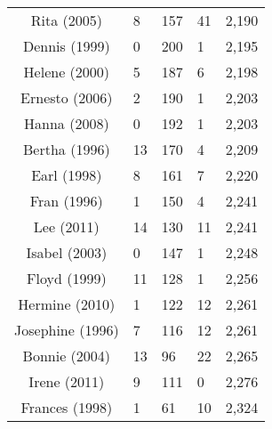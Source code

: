\begin{table}[ht]
\begin{tabular}{cP{3cm}P{3cm}P{3cm}P{3cm}}
  Rita (2005) & 8 & 157 & 41 & 2,190 \\ 
  Dennis (1999) & 0 & 200 & 1 & 2,195 \\ 
  Helene (2000) & 5 & 187 & 6 & 2,198 \\ 
  Ernesto (2006) & 2 & 190 & 1 & 2,203 \\ 
  Hanna (2008) & 0 & 192 & 1 & 2,203 \\ 
  Bertha (1996) & 13 & 170 & 4 & 2,209 \\ 
  Earl (1998) & 8 & 161 & 7 & 2,220 \\ 
  Fran (1996) & 1 & 150 & 4 & 2,241 \\ 
  Lee (2011) & 14 & 130 & 11 & 2,241 \\ 
  Isabel (2003) & 0 & 147 & 1 & 2,248 \\ 
  Floyd (1999) & 11 & 128 & 1 & 2,256 \\ 
  Hermine (2010) & 1 & 122 & 12 & 2,261 \\ 
  Josephine (1996) & 7 & 116 & 12 & 2,261 \\ 
  Bonnie (2004) & 13 & 96 & 22 & 2,265 \\ 
  Irene (2011) & 9 & 111 & 0 & 2,276 \\ 
  Frances (1998) & 1 & 61 & 10 & 2,324 \\ 
   \bottomrule
\end{tabular}
\end{table}
